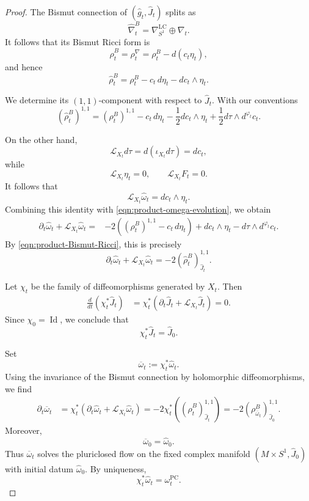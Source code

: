 \documentclass[10pt,a4paper]{amsart}
\begin{document}
\begin{proof}
The Bismut connection of
$(\widehat g_t,\widehat J_t)$ splits as
\[
\widehat\nabla_t^B
=
\nabla^{\mathrm{LC}}_{S^1}\oplus\nabla_t.
\]
It follows that its Bismut Ricci form is
\[
\widehat\rho_t^B
=
\rho_t^\nabla
=
\rho_t^B-d(c_t\eta_t),
\]
and hence
\[
\widehat\rho_t^B
=
\rho_t^B-c_t\,d\eta_t-dc_t\wedge\eta_t.
\]

We determine its $(1,1)$-component with respect to
$\widehat J_t$. With our conventions
\begin{equation}
\label{eqn:product-Bismut-Ricci}
\left(\widehat\rho_t^B\right)^{1,1}
=
(\rho_t^B)^{1,1}
-
c_t\,d\eta_t
-
\frac12dc_t\wedge\eta_t
+
\frac12d\tau\wedge d^{\varphi_t}c_t.
\end{equation}

On the other hand,
\[
\mathcal L_{X_t}d\tau
=
d(\iota_{X_t}d\tau)
=
dc_t,
\]
while
\[
\mathcal L_{X_t}\eta_t=0,
\qquad
\mathcal L_{X_t}F_t=0.
\]
It follows that
\[
\mathcal L_{X_t}\widehat\omega_t
=
dc_t\wedge\eta_t.
\]
Combining this identity with
\eqref{eqn:product-omega-evolution}, we obtain
\[
\begin{aligned}
\partial_t\widehat\omega_t
+
\mathcal L_{X_t}\widehat\omega_t
={}&
-2\left((\rho_t^B)^{1,1}-c_t\,d\eta_t\right)
+
dc_t\wedge\eta_t
-
d\tau\wedge d^{\varphi_t}c_t.
\end{aligned}
\]
By \eqref{eqn:product-Bismut-Ricci}, this is precisely
\[
\partial_t\widehat\omega_t
+
\mathcal L_{X_t}\widehat\omega_t
=
-2\left(\widehat\rho_t^B\right)^{1,1}_{\widehat J_t}.
\]

Let $\chi_t$ be the family of diffeomorphisms generated by $X_t$.
Then
\[
\begin{aligned}
\frac{d}{dt}\left(\chi_t^*\widehat J_t\right)
&=
\chi_t^*
\left(
\partial_t\widehat J_t
+
\mathcal L_{X_t}\widehat J_t
\right)=0.
\end{aligned}
\]
Since $\chi_0=\operatorname{Id}$, we conclude that
\[
\chi_t^*\widehat J_t=\widehat J_0.
\]

Set
\[
\overline\omega_t:=\chi_t^*\widehat\omega_t.
\]
Using the invariance of the Bismut connection by holomorphic diffeomorphisms, we find
\[
\begin{aligned}
\partial_t\overline\omega_t
&=
\chi_t^*
\left(
\partial_t\widehat\omega_t
+
\mathcal L_{X_t}\widehat\omega_t
\right)=
-2\chi_t^*
\left(
\left(\widehat\rho_t^B\right)^{1,1}_{\widehat J_t}
\right)=
-2\left(
\rho^B_{\overline\omega_t}
\right)^{1,1}_{\widehat J_0}.
\end{aligned}
\]
Moreover,
\[
\overline\omega_0=\widehat\omega_0.
\]
Thus $\overline\omega_t$ solves the pluriclosed flow on the fixed
complex manifold $(M\times S^1,\widehat J_0)$ with initial datum
$\widehat\omega_0$. By uniqueness,
\[
\chi_t^*\widehat\omega_t
=
\omega_t^{\mathrm{PC}}.
\]
 \end{proof}
\end{document}
